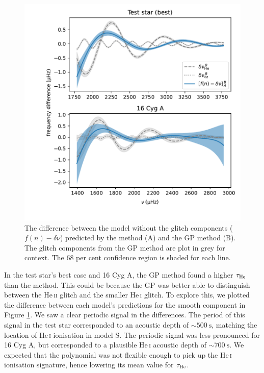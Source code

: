 \begin{figure}[!tb]
    \centering
    \includegraphics[trim={0.4in 0.2in 0 0},clip]{figures/glitch-res.pdf}
    \caption[The difference between the model without the glitch components predicted by theV19 method and the GP method.]{The difference between the model without the glitch components (\(f(n) - \delta\nu\)) predicted by the  method (A) and the GP method (B). The glitch components from the GP method are plot in grey for context. The 68 per cent confidence region is shaded for each line.}
    \label{fig:smooth-res}
\end{figure}

In the test star's best case and 16 Cyg A, the GP method found a higher \(\tau_{{\mathrm{He}}}\) than the  method. This could be because the GP was better able to distinguish between the He\,\textsc{ii} glitch and the smaller He\,\textsc{i} glitch. To explore this, we plotted the difference between each model's predictions for the smooth component in Figure \ref{fig:smooth-res}. We saw a clear periodic signal in the differences. The period of this signal in the test star corresponded to an acoustic depth of \(\sim \SI{500}{\second}\), matching the location of He\,\textsc{i} ionisation in model S. The periodic signal was less pronounced for 16 Cyg A, but corresponded to a plausible He\,\textsc{i} acoustic depth of \(\sim \SI{700}{\second}\). We expected that the polynomial was not flexible enough to pick up the He\,\textsc{i} ionisation signature, hence lowering its mean value for \(\tau_{{\mathrm{He}}}\).

